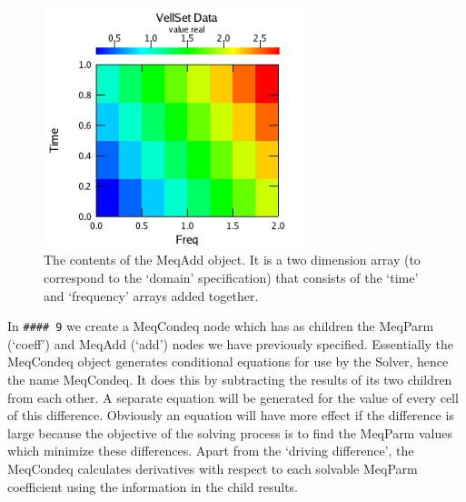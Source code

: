 \documentclass[10pt]{article}
\begin{document}
\begin{figure}
{\par\centering
\includegraphics[width=3.0in]{FiguresAndDiagrams/add}
\par}
\caption {The contents of the MeqAdd object. It is a two dimension array (to
correspond to the `domain' specification) that consists of the `time' and
`frequency' arrays added together.}
\label{fig:add}
\end{figure}

In {\tt \#\#\#\# 9} we create a MeqCondeq node which has as 
children the MeqParm (`coeff') and MeqAdd (`add') nodes we have 
previously specified. Essentially the MeqCondeq object generates conditional
equations for use by the Solver, hence the name MeqCondeq. It does this
by subtracting the results of its two children from each other. A separate
equation will be generated for the value of every cell of this difference.
Obviously an equation will have more effect if the difference is large
because the objective of the solving process is to find the MeqParm
values which minimize these differences. Apart from the `driving difference',
the MeqCondeq calculates derivatives with respect to each solvable
MeqParm coefficient using the information in the child results.
\end{document}
